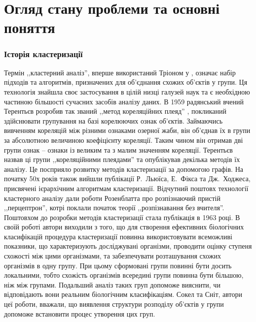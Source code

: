 \chapter{Огляд стану проблеми та основні поняття}\label{ch:01}

\subsection{Історія кластеризації}
Термін ,,кластерний аналіз'', вперше використаний Тріоном у \cite{Tryon:Cluster:1939}, означає набір підходів та алгоритмів, призначених для об'єднання схожих об'єктів у групи. Ця технологія знайшла своє застосування в цілій низці галузей наук та є необхідною частиною більшості сучасних засобів аналізу даних.
В 1959 радянський вчений Терентьєв розробив так званий ,,метод кореляційних плеяд'' \cite{Terentyev}, покликаний здійснювати групування на базі корелюючих ознак об'єктів. Займаючись вивченням кореляцій між різними ознаками озерної жаби, він об'єднав їх в групи за абсолютною величиною коефіцієнту кореляції. Таким чином він отримав дві групи ознак -- ознаки із великим та з малим значенням кореляції. Терентьєв назвав ці групи ,,кореляційними плеядами'' та опублікував декілька методів їх аналізу. Це посприяло розвитку методів кластеризації за допомогою графів. На початку 50х років також вийшли публікації Р.~Льюїса, Е.~Фікса та Дж.~Ходжеса, присвячені ієрархічним алгоритмам кластеризації. Відчутний поштовх технології кластерного аналізу дали роботи Розенблатта про розпізнаючий пристій ,,перцептрон'', котрі поклали початок теорії ,,розпізнавання без вчителя''. Поштовхом до розробки методів кластеризації стала публікація \cite{SokalSneath} в 1963 році. В своїй роботі автори виходили з того, що для створення ефективних біологічних класифікацій процедура кластеризації повинна використовувати всеможливі показники, що характеризують досліджувані організми, проводити оцінку ступеня схожості між цими організмами, та забезпечувати розташування схожих організмів в одну групу. При цьому сформовані групи повинні бути досить локальними, тобто схожість організмів всередині групи повинна бути більшою, ніж між групами. Подальший аналіз таких груп допоможе вияснити, чи відповідають вони реальним біологічним класифікаціям. Сокел та Сніт, автори цеї роботи, вважали, що виявлення структури розподілу об'єктів у групи допоможе встановити процес утворення цих груп.

